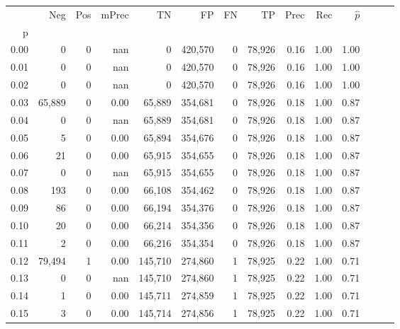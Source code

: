 \begin{tabular}{rrrrrrrrrrrrrr}
\toprule
{} &     Neg &     Pos & mPrec &       TN &       FP &      FN &      TP &  Prec &   Rec & $\hat{p}$ \\
p    &         &         &       &          &          &         &         &       &       &           \\
\midrule
0.00 &       0 &       0 &   nan &        0 &  420,570 &       0 &  78,926 &  0.16 &  1.00 &      1.00 \\
0.01 &       0 &       0 &   nan &        0 &  420,570 &       0 &  78,926 &  0.16 &  1.00 &      1.00 \\
0.02 &       0 &       0 &   nan &        0 &  420,570 &       0 &  78,926 &  0.16 &  1.00 &      1.00 \\
0.03 &  65,889 &       0 &  0.00 &   65,889 &  354,681 &       0 &  78,926 &  0.18 &  1.00 &      0.87 \\
0.04 &       0 &       0 &   nan &   65,889 &  354,681 &       0 &  78,926 &  0.18 &  1.00 &      0.87 \\
0.05 &       5 &       0 &  0.00 &   65,894 &  354,676 &       0 &  78,926 &  0.18 &  1.00 &      0.87 \\
0.06 &      21 &       0 &  0.00 &   65,915 &  354,655 &       0 &  78,926 &  0.18 &  1.00 &      0.87 \\
0.07 &       0 &       0 &   nan &   65,915 &  354,655 &       0 &  78,926 &  0.18 &  1.00 &      0.87 \\
0.08 &     193 &       0 &  0.00 &   66,108 &  354,462 &       0 &  78,926 &  0.18 &  1.00 &      0.87 \\
0.09 &      86 &       0 &  0.00 &   66,194 &  354,376 &       0 &  78,926 &  0.18 &  1.00 &      0.87 \\
0.10 &      20 &       0 &  0.00 &   66,214 &  354,356 &       0 &  78,926 &  0.18 &  1.00 &      0.87 \\
0.11 &       2 &       0 &  0.00 &   66,216 &  354,354 &       0 &  78,926 &  0.18 &  1.00 &      0.87 \\
0.12 &  79,494 &       1 &  0.00 &  145,710 &  274,860 &       1 &  78,925 &  0.22 &  1.00 &      0.71 \\
0.13 &       0 &       0 &   nan &  145,710 &  274,860 &       1 &  78,925 &  0.22 &  1.00 &      0.71 \\
0.14 &       1 &       0 &  0.00 &  145,711 &  274,859 &       1 &  78,925 &  0.22 &  1.00 &      0.71 \\
0.15 &       3 &       0 &  0.00 &  145,714 &  274,856 &       1 &  78,925 &  0.22 &  1.00 &      0.71 \\

\end{tabular}
